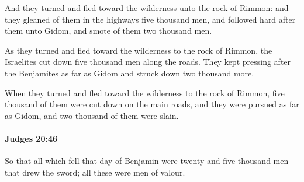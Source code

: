 			\begin{versebox}
					\item[BHS] 
					\item[ASV] And they turned and fled toward the wilderness unto the rock of Rimmon: and they gleaned of them in the highways five thousand men, and followed hard after them unto Gidom, and smote of them two thousand men.
					\item[NIV] As they turned and fled toward the wilderness to the rock of Rimmon, the Israelites cut down five thousand men along the roads. They kept pressing after the Benjamites as far as Gidom and struck down two thousand more.
					\item[NRSV] When they turned and fled toward the wilderness to the rock of Rimmon, five thousand of them were cut down on the main roads, and they were pursued as far as Gidom, and two thousand of them were slain.
			\end{versebox}

		\paragraph{Judges 20:46} %
			\label{JUDGES-20-46}

			So that all which fell that day of Benjamin were twenty and five thousand men that drew the sword; all these were men of valour.

